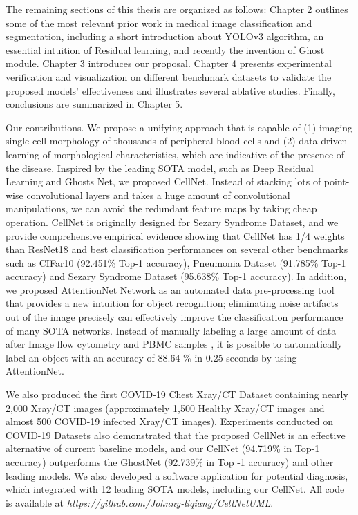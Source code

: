 The remaining sections of this thesis are organized as follows: Chapter 2 outlines some of the most relevant prior work in medical image classification and segmentation, including a short introduction about YOLOv3 \cite{33} algorithm, an essential intuition of Residual learning, and recently the invention of Ghost module.
Chapter 3 introduces our proposal. Chapter 4 presents experimental verification and visualization on different benchmark datasets to validate the proposed models' effectiveness and illustrates several ablative studies. Finally, conclusions are summarized in Chapter 5.

Our contributions. We propose a unifying approach that is capable of (1) imaging single-cell morphology of thousands of peripheral blood cells and (2) data-driven learning of morphological characteristics, which are indicative of the presence of the disease.
Inspired by the leading SOTA model, such as Deep Residual Learning\cite{20} and Ghosts Net\cite{19}, we proposed CellNet. Instead of stacking lots of point-wise convolutional layers and takes a huge amount of convolutional manipulations, we can avoid the redundant feature maps by taking cheap operation. CellNet is originally designed for Sezary Syndrome Dataset, and we provide comprehensive empirical evidence showing that CellNet has 1/4 weights than ResNet18 \cite{20} and best classification performances on 
several other benchmarks such as CIFar10 \cite{21} (92.451\% Top-1 accuracy), Pneumonia Dataset\cite{38} (91.785\% Top-1 accuracy) and Sezary Syndrome Dataset (95.638\% Top-1 accuracy).
In addition, we proposed AttentionNet Network as an automated data pre-processing tool that provides a new intuition for object recognition; eliminating noise artifacts out of the image precisely can effectively improve the classification performance of many SOTA networks. Instead of manually labeling a large amount of data after Image flow cytometry and PBMC samples \cite{12}, it is possible to automatically label an object with an accuracy of 88.64 \% in 0.25 seconds by using AttentionNet. 

We also produced the first COVID-19 Chest Xray/CT Dataset containing nearly 2,000 Xray/CT images (approximately 1,500 Healthy Xray/CT images and almost 500 COVID-19 infected Xray/CT images). Experiments conducted on COVID-19 Datasets also demonstrated that the proposed CellNet is an effective alternative of current baseline models, and our CellNet (94.719\% in Top-1 accuracy) outperforms the GhostNet\cite{19} (92.739\%  in Top -1 accuracy) and other leading models. We also developed a software application for potential diagnosis, which integrated with 12 leading SOTA models, including our CellNet. All code is available at \textit{https://github.com/Johnny-liqiang/CellNetUML}.

